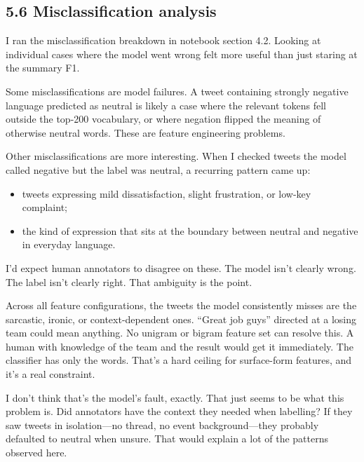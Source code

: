 \documentclass[12pt]{article}
\begin{document}
\subsection*{5.6 Misclassification analysis}



I ran the misclassification breakdown in notebook section 4.2.
Looking at individual cases where the model went wrong felt more useful than just staring at the summary F1.

Some misclassifications are model failures. A tweet containing strongly negative language predicted as neutral is likely a case where the relevant tokens fell outside the top-200 vocabulary, or where negation flipped the meaning of otherwise neutral words. These are feature engineering problems.

Other misclassifications are more interesting. When I checked tweets the model called negative but the label was neutral, a recurring pattern came up:

\begin{itemize}

  \item tweets expressing mild dissatisfaction, slight frustration, or low-key complaint;

  \item the kind of expression that sits at the boundary between neutral and negative in everyday language.

\end{itemize} I'd expect human annotators to disagree on these. The model isn't clearly wrong. The label isn't clearly right. That ambiguity is the point.


Across all feature configurations, the tweets the model consistently misses are the sarcastic, ironic, or context-dependent ones. ``Great job guys'' directed at a losing team could mean anything. No unigram or bigram feature set can resolve this. A human with knowledge of the team and the result would get it immediately. The classifier has only the words. That's a hard ceiling for surface-form features, and it's a real constraint.

I don't think that's the model's fault, exactly. That just seems to be what this problem is. Did annotators have the context they needed when labelling? If they saw tweets in isolation---no thread, no event background---they probably defaulted to neutral when unsure. That would explain a lot of the patterns observed here.
\end{document}
